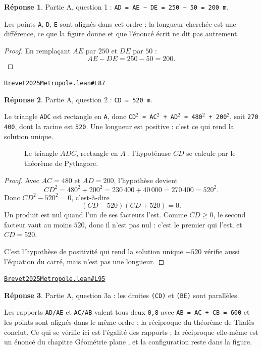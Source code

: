 \documentclass[11pt,a4paper]{article}
\theoremstyle{definition}
\theoremstyle{plain}
\theoremstyle{definition}
\newtheorem*{reponse}{Réponse}
\newcommand{\source}[2]{\par\smallskip\noindent\hfill{\footnotesize\href{#1}{\texttt{#2}}}\par\smallskip}
\begin{document}
\begin{reponse}
Partie A, question 1 : \texttt{AD = AE − DE = 250 − 50 = 200 m}.

Les points \texttt{A}, \texttt{D}, \texttt{E} sont alignés dans cet ordre : la longueur cherchée est une
différence, ce que la figure donne et que l'énoncé écrit ne dit pas autrement.
\end{reponse}
\begin{proof}
En remplaçant $AE$ par $250$ et $DE$ par $50$ :
\[ AE - DE = 250 - 50 = 200 . \]
\end{proof}
\source{https://github.com/Commutator-IO/learn-lean/blob/main/exams/2025/Brevet2025Metropole.lean\#L87}{Brevet2025Metropole.lean\#L87}

\begin{reponse}
Partie A, question 2 : \texttt{CD = 520 m}.

Le triangle \texttt{ADC} est rectangle en \texttt{A}, donc \texttt{CD\(^{2}\) = AC\(^{2}\) + AD\(^{2}\) = 480\(^{2}\) + 200\(^{2}\)}, soit
\texttt{270 400}, dont la racine est \texttt{520}. Une longueur est positive : c'est ce qui rend la
solution unique.
\end{reponse}

\begin{figure}[h]
\centering

\caption{Le triangle \(ADC\), rectangle en \(A\) : l'hypoténuse \(CD\) se calcule par le théorème de Pythagore.}
\end{figure}
\begin{proof}
Avec $AC = 480$ et $AD = 200$, l'hypothèse devient
\[ CD^2 = 480^2 + 200^2 = 230\,400 + 40\,000 = 270\,400 = 520^2 . \]
Donc $CD^2 - 520^2 = 0$, c'est-à-dire
\[ (CD - 520)(CD + 520) = 0 . \]
Un produit est nul quand l'un de ses facteurs l'est. Comme $CD \ge 0$, le second facteur
vaut au moins $520$, donc il n'est pas nul : c'est le premier qui l'est, et $CD = 520$.

C'est l'hypothèse de positivité qui rend la solution unique \textemdash{} $-520$ vérifie
aussi l'équation du carré, mais n'est pas une longueur.
\end{proof}
\source{https://github.com/Commutator-IO/learn-lean/blob/main/exams/2025/Brevet2025Metropole.lean\#L95}{Brevet2025Metropole.lean\#L95}

\begin{reponse}
Partie A, question 3a : les droites \texttt{(CD)} et \texttt{(BE)} sont parallèles.

Les rapports \texttt{AD/AE} et \texttt{AC/AB} valent tous deux \texttt{0,8} \textemdash{} avec \texttt{AB = AC + CB = 600} \textemdash{}
et les points sont alignés dans le même ordre : la réciproque du théorème de Thalès
conclut. Ce qui se vérifie ici est l'égalité des rapports ; la réciproque elle-même
est un énoncé du chapitre \og{} Géométrie plane \fg{}, et la configuration reste dans la
figure.
\end{reponse}
\end{document}
